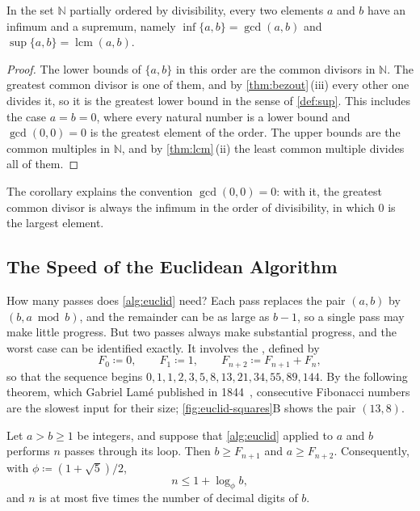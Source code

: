\begin{corollary}
\label{cor:gcd-lattice}
In the set $\mathbb N$ partially ordered by divisibility, every two elements $a$ and $b$ have an infimum and a supremum, namely $\inf\{a,b\}=\gcd(a,b)$ and $\sup\{a,b\}=\operatorname{lcm}(a,b)$.
\end{corollary}

\begin{proof}
The lower bounds of $\{a,b\}$ in this order are the common divisors in $\mathbb N$. The greatest common divisor is one of them, and by \cref{thm:bezout}\,(iii) every other one divides it, so it is the greatest lower bound in the sense of \cref{def:sup}. This includes the case $a=b=0$, where every natural number is a lower bound and $\gcd(0,0)=0$ is the greatest element of the order. The upper bounds are the common multiples in $\mathbb N$, and by \cref{thm:lcm}\,(ii) the least common multiple divides all of them.
\end{proof}

The corollary explains the convention $\gcd(0,0)=0$: with it, the greatest common divisor is always the infimum in the order of divisibility, in which $0$ is the largest element.

\subsection{The Speed of the Euclidean Algorithm}

How many passes does \cref{alg:euclid} need? Each pass replaces the pair $(a,b)$ by $(b,a\bmod b)$, and the remainder can be as large as $b-1$, so a single pass may make little progress. But two passes always make substantial progress, and the worst case can be identified exactly. It involves the , defined by
\[
F_0\coloneqq0,\qquad F_1\coloneqq1,\qquad F_{n+2}\coloneqq F_{n+1}+F_n,
\]
so that the sequence begins $0,1,1,2,3,5,8,13,21,34,55,89,144$. By the following theorem, which Gabriel Lam\'e published in 1844~\cite{lame1844}, consecutive Fibonacci numbers are the slowest input for their size; \cref{fig:euclid-squares}B shows the pair $(13,8)$.

\begin{theorem}[Lam\'e]
\label{thm:lame}
Let $a>b\ge1$ be integers, and suppose that \cref{alg:euclid} applied to $a$ and $b$ performs $n$ passes through its loop. Then $b\ge F_{n+1}$ and $a\ge F_{n+2}$. Consequently, with $\phi\coloneqq(1+\sqrt5)/2$,
\[
n\le1+\log_\phi b ,
\]
and $n$ is at most five times the number of decimal digits of $b$.
\end{theorem}

